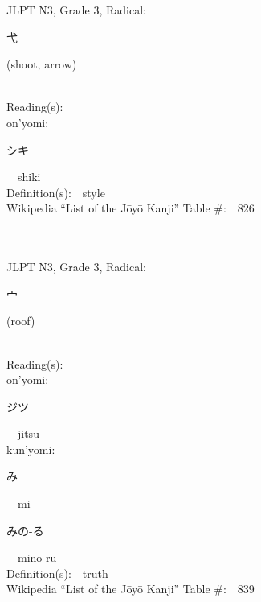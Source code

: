 \begin{multicols}{2}
{JLPT N3, Grade 3, Radical:\ \ {\begin{CJK}{UTF8}{min} 弋 \end{CJK}} (shoot, arrow) } \\
Reading(s):\ \ \\
{\hspace*{1em}}on'yomi:\ \ \\
{\hspace*{2em}}{\begin{CJK}{UTF8}{min} シキ \end{CJK}}\ \ shiki\ \ \\
Definition(s):\ \ style \\
Wikipedia ``List of the J\=oy\=o Kanji'' Table \#:\ \ 826 \\
\ \ \\
{\fontsize{34pt}{40pt}  }\ \ \\  %
{JLPT N3, Grade 3, Radical:\ \ {\begin{CJK}{UTF8}{min} 宀 \end{CJK}} (roof) } \\
Reading(s):\ \ \\
{\hspace*{1em}}on'yomi:\ \ \\
{\hspace*{2em}}{\begin{CJK}{UTF8}{min} ジツ \end{CJK}}\ \ jitsu\ \ \\
{\hspace*{1em}}kun'yomi:\ \ \\
{\hspace*{2em}}{\begin{CJK}{UTF8}{min} み \end{CJK}}\ \ mi\ \ \\
{\hspace*{2em}}{\begin{CJK}{UTF8}{min} みの-る \end{CJK}}\ \ mino-ru\ \ \\
Definition(s):\ \ truth \\
Wikipedia ``List of the J\=oy\=o Kanji'' Table \#:\ \ 839 \\
\ \ \\
{\fontsize{34pt}{40pt}  }\ \ \\  %

\end{multicols}
